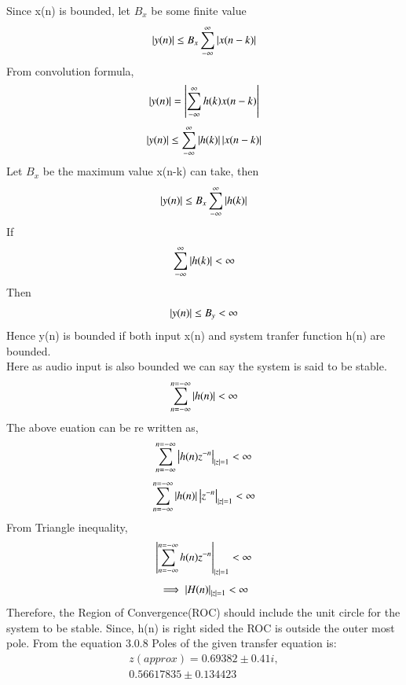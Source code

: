 \documentclass[journal,12pt,twocolumn]{IEEEtran}
\begin{document}
Since x(n) is bounded, let $B_{x}$ be some finite value
\begin{equation}
\left\vert y(n)\right\vert \leq B_{x}\sum_{-\infty}^{\infty} \left\vert x(n-k)\right\vert
\end{equation}
From convolution formula,
\begin{equation}
\left\vert y(n)\right\vert = \left\vert\sum_{-\infty}^{\infty} h(k)x(n-k)\right\vert
\end{equation}
\begin{equation}
\left\vert y(n)\right\vert \leq \sum_{-\infty}^{\infty} \left\vert h(k)\right\vert\left\vert x(n-k)\right\vert
\end{equation}
Let $B_{x}$ be the maximum value x(n-k) can take, then
\begin{equation}
\left\vert y(n)\right\vert \leq B_{x}\sum_{-\infty}^{\infty} \left\vert h(k)\right\vert
\end{equation}
If
\begin{equation}
\sum_{-\infty}^{\infty} \left\vert h(k)\right\vert < \infty
\end{equation}
Then
\begin{equation}
\left\vert y(n)\right\vert \leq B_{y} < \infty
\end{equation}
Hence y(n) is bounded if both input x(n) and system tranfer function h(n) are bounded.\\
Here as audio input is also bounded we can say the system is said to be stable.
\begin{equation}
\sum_{n=-\infty}^{n=-\infty} \left\vert h(n)\right\vert<\infty
\end{equation}
The above euation can be re written as,
\begin{equation}
\sum_{n=-\infty}^{n=-\infty} \left\vert h(n)z^{-n}\right\vert_{\left\vert z\right\vert=1}<\infty
\end{equation}
\begin{equation}
\sum_{n=-\infty}^{n=-\infty} \left\vert h(n)\right\vert \left\vert z^{-n}\right\vert_{\left\vert z\right\vert=1}<\infty
\end{equation}
From Triangle inequality,
\begin{equation}
\left\vert\sum_{n=-\infty}^{n=-\infty} h(n)z^{-n}\right\vert_{\left\vert z\right\vert=1}<\infty
\end{equation}
\begin{equation}
\implies \left\vert H(n)\right\vert_{\left\vert z\right\vert=1} < \infty
\end{equation}
Therefore, the Region of Convergence(ROC) should include the unit circle for the system to be stable.
Since, h(n) is right sided the ROC is outside the outer most pole. From the equation 3.0.8
Poles of the given transfer equation is:
\begin{equation}
\begin{split}
z(approx) = 0.69382 \pm 0.41i,
\\
 0.56617835 \pm 0.134423
\end{split}  
\end{equation}
\end{document}
